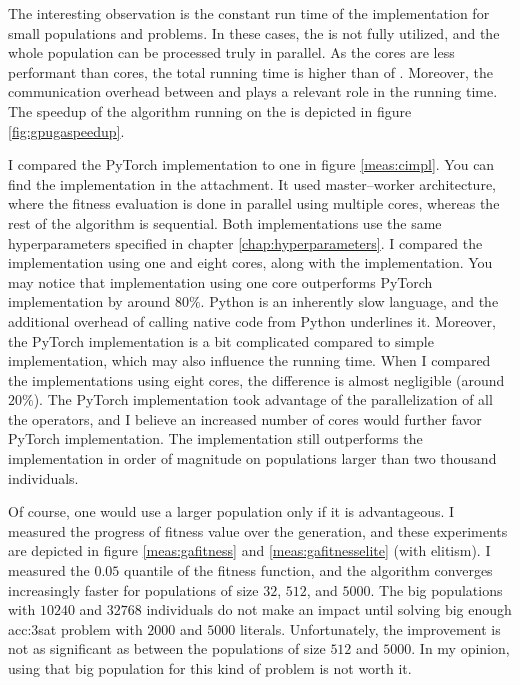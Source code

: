 The interesting observation is the constant run time of the \gpu implementation for small populations and problems. In these cases, the \gpu is not fully utilized, and the whole population can be processed truly in parallel. As the \cuda cores are less performant than \cpu cores, the total running time is higher than of \cpuns. Moreover, the communication overhead between \cpu and \gpu plays a relevant role in the running time. The speedup of the algorithm running on the \gpu is depicted in figure \ref{fig:gpugaspeedup}.

I compared the PyTorch implementation to \cpp one in figure \ref{meas:cimpl}. You can find the \cpp implementation in the attachment. It used master--worker architecture, where the fitness evaluation is done in parallel using multiple cores, whereas the rest of the algorithm is sequential. Both implementations use the same hyperparameters specified in chapter \ref{chap:hyperparameters}. I compared the implementation using one and eight cores, along with the \gpu implementation. You may notice that \cpp implementation using one core outperforms PyTorch implementation by around $80\%$. Python is an inherently slow language, and the additional overhead of calling native code from Python underlines it. Moreover, the PyTorch implementation is a bit complicated compared to simple \cpp implementation, which may also influence the running time. When I compared the implementations using eight cores, the difference is almost negligible (around $20\%$). The PyTorch implementation took advantage of the parallelization of all the operators, and I believe an increased number of cores would further favor PyTorch implementation. The \gpu implementation still outperforms the \cpp implementation in order of magnitude on populations larger than two thousand individuals.

Of course, one would use a larger population only if it is advantageous. I measured the progress of fitness value over the generation, and these experiments are depicted in figure \ref{meas:gafitness} and \ref{meas:gafitnesselite} (with elitism). I measured the $0.05$ quantile of the fitness function, and the algorithm converges increasingly faster for populations of size $32$, $512$, and $5000$. The big populations with $10240$ and $32768$ individuals do not make an impact until solving big enough \acrshort{acc:3sat} problem with $2000$ and $5000$ literals. Unfortunately, the improvement is not as significant as between the populations of size $512$ and $5000$. In my opinion, using that big population for this kind of problem is not worth it.

